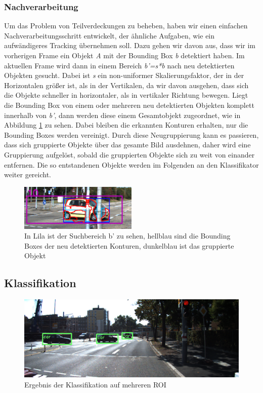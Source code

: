 \documentclass[conference]{IEEEtran}
\begin{document}
\subsubsection{Nachverarbeitung}

Um das Problem von Teilverdeckungen zu beheben, haben wir einen einfachen Nachverarbeitungsschritt entwickelt, der ähnliche Aufgaben, wie ein aufwändigeres Tracking übernehmen soll. Dazu gehen wir davon aus, dass wir im vorherigen Frame ein Objekt \textit{A} mit der Bounding Box \textit{b} detektiert haben. Im aktuellen Frame wird dann in einem Bereich \textit{b'=s*b} nach neu detektierten Objekten gesucht. Dabei ist \textit{s} ein non-uniformer Skalierungsfaktor, der in der Horizontalen größer ist, als in der Vertikalen, da wir davon ausgehen, dass sich die Objekte schneller in horizontaler, als in vertikaler Richtung bewegen. Liegt die Bounding Box von einem oder mehreren neu detektierten Objekten komplett innerhalb von \textit{b'}, dann werden diese einem Gesamtobjekt zugeordnet, wie in Abbildung \ref{fig:trainds01_nachverarbeitung} zu sehen. Dabei bleiben die erkannten Konturen erhalten, nur die Bounding Boxes werden vereinigt. Durch diese Neugruppierung kann es passieren, dass sich gruppierte Objekte über das gesamte Bild ausdehnen, daher wird eine Gruppierung aufgelöst, sobald die gruppierten Objekte sich zu weit von einander entfernen. Die so entstandenen Objekte werden im Folgenden an den Klassifikator weiter gereicht.

\begin{figure}
	\centering
	\includegraphics[width=0.5\textwidth]{trainds01_nachverarbeitung}
	\caption{In Lila ist der Suchbereich b' zu sehen, hellblau sind die Bounding Boxes der neu detektierten Konturen, dunkelblau ist das gruppierte Objekt}
	\label{fig:trainds01_nachverarbeitung}
\end{figure}

\subsection{Klassifikation}

\begin{figure}
	\includegraphics[width=\textwidth]{ds03_car01}
	\caption{Ergebnis der Klassifikation auf mehreren ROI}
\end{figure}
\end{document}
